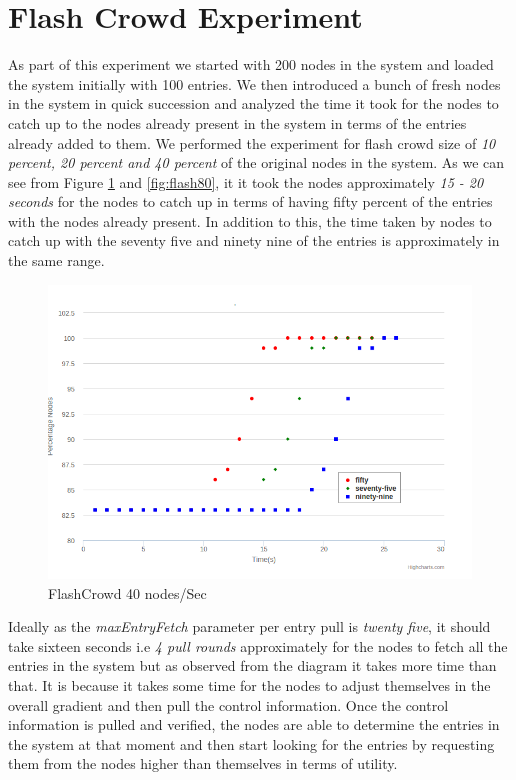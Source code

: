 \documentclass[a4paper,11pt]{kth-mag}
\begin{document}
\section{Flash Crowd Experiment}
As part of this experiment we started with 200 nodes in the system and loaded the system initially with 100 entries. We then introduced a bunch of fresh nodes in the system in quick succession and analyzed the time it took for the nodes to catch up to the nodes already present in the system in terms of the entries already added to them. We performed the experiment for flash crowd size of \textit{10 percent, 20 percent and 40 percent} of the original nodes in the system. As we can see from Figure \ref{fig:flash40} and \ref{fig:flash80}, it it took the nodes approximately \textit{ 15 - 20 seconds} for the nodes to catch up in terms of having fifty percent of the entries with the nodes already present. In addition to this, the time taken by nodes to catch up with the seventy five and ninety nine of the entries is approximately in the same range.

\begin{figure}[h]
	\includegraphics[scale=0.5]{200-40Nodes}
	\caption{FlashCrowd 40 nodes/Sec }
	\label{fig:flash40}
\end{figure}

\par Ideally as the \textit{maxEntryFetch} parameter per entry pull is \textit{twenty five}, it should take sixteen seconds i.e \textit{4 pull rounds} approximately for the nodes to fetch all the entries in the system but as observed from the diagram it takes more time than that. It is because it takes some time for the nodes to adjust themselves in the overall gradient and then pull the control information. Once the control information is pulled and verified, the nodes are able to determine the entries in the system at that moment and then start looking for the entries by requesting them from the nodes higher than themselves in terms of utility.
\end{document}

